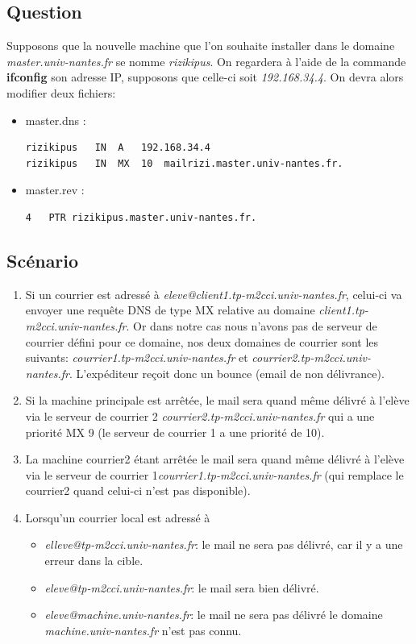 \documentclass[a4paper,10pt]{article}
\begin{document}
\subsection{Question}
Supposons que la nouvelle machine que l'on souhaite installer dans le domaine \textit{master.univ-nantes.fr} se nomme \textit{rizikipus}. On regardera à l'aide de la commande \textbf{ifconfig} son adresse IP, supposons que celle-ci soit \textit{192.168.34.4}. On devra alors modifier deux fichiers:
\begin{itemize}
\item master.dns :
\begin{lstlisting}
rizikipus	IN	A	192.168.34.4
rizikipus	IN	MX	10	mailrizi.master.univ-nantes.fr.
\end{lstlisting}
\item master.rev :
\begin{lstlisting}
4	PTR	rizikipus.master.univ-nantes.fr.
\end{lstlisting}
\end{itemize}

\subsection{Scénario}
\begin{enumerate}
\item Si un courrier est adressé à \textit{eleve@client1.tp-m2cci.univ-nantes.fr}, celui-ci va envoyer une requête DNS de type MX relative au domaine \textit{client1.tp-m2cci.univ-nantes.fr}. Or dans notre cas nous n'avons pas de serveur de courrier défini pour ce domaine, nos deux domaines de courrier sont les suivants: \textit{courrier1.tp-m2cci.univ-nantes.fr} et \textit{courrier2.tp-m2cci.univ-nantes.fr}.
L'expéditeur reçoit donc un bounce (email de non délivrance).
\item Si la machine principale est arrêtée, le mail sera quand même délivré à l'elève via le serveur de courrier 2 \textit{courrier2.tp-m2cci.univ-nantes.fr} qui a une priorité MX 9 (le serveur de courrier 1 a une priorité de 10).
\item La machine courrier2 étant arrêtée le mail sera quand même délivré à l'elève via le serveur de courrier 1\textit{courrier1.tp-m2cci.univ-nantes.fr} (qui remplace le courrier2 quand celui-ci n'est pas disponible).
\item Lorsqu'un courrier local est adressé à
\begin{itemize}
\item \textit{elleve@tp-m2cci.univ-nantes.fr}: le mail ne sera pas délivré, car il y a une erreur dans la cible.
\item \textit{eleve@tp-m2cci.univ-nantes.fr}: le mail sera bien délivré.
\item \textit{eleve@machine.univ-nantes.fr}: le mail ne sera pas délivré le domaine \textit{machine.univ-nantes.fr} n'est pas connu.
\end{itemize}
\end{enumerate}
\end{document}
